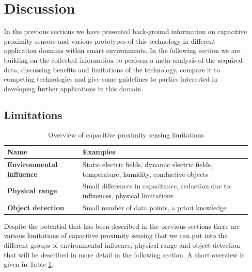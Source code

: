 \section{Discussion}
In the previous sections we have presented back-ground information on capacitive proximity sensors and various prototypes of this technology in different application domains within smart environments. In the following section we are building on the collected information to perform a meta-analysis of the acquired data, discussing benefits and limitations of the technology, compare it to competing technologies and give some guidelines to parties interested in developing further applications in this domain. 
\subsection{Limitations}
\begin{table}[htbp]
  \centering
  \caption{Overview of capacitive proximity sensing limitations}
    \begin{tabular}{p{4cm}p{6cm}}
    \toprule
    \textbf{Name} & \textbf{Examples} \\
    \midrule
    \textbf{Environmental influence} & Static electric fields, dynamic electric fields, temperature, humidity, conductive objects \\
    \textbf{Physical range} & Small differences in capacitance, reduction due to influences, physical limitations \\
    \textbf{Object detection} & Small number of data points, a priori knowledge \\
    \bottomrule
    \end{tabular}%
  \label{tab:cap_limitations}%
\end{table}%

Despite the potential that has been described in the previous sections there are various limitations of capacitive proximity sensing that we can put into the different groups of environmental influence, physical range and object detection that will be described in more detail in the following section. A short overview is given in Table \ref{tab:cap_limitations}.
